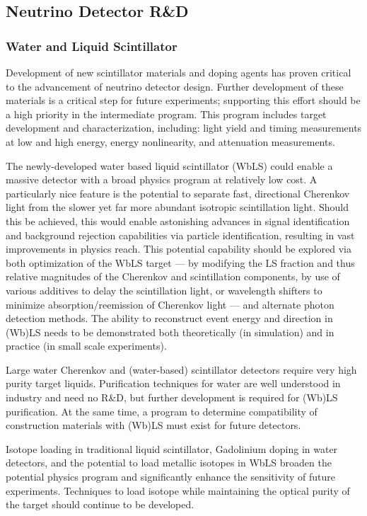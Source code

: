 \subsection{Neutrino Detector R\&D}
\label{sec:RandD}

\subsubsection{Water and Liquid Scintillator}

Development of new scintillator materials and doping agents has proven critical to the advancement 
of neutrino detector design. Further development of these materials is a critical step for future 
experiments; supporting this effort should be a high priority in the intermediate program. This program 
includes target development and characterization, including: light yield and timing measurements at 
low and high energy, energy nonlinearity, and attenuation measurements.

The newly-developed water based liquid scintillator (WbLS) could enable a massive detector with a 
broad physics program at relatively low cost. A particularly nice feature is the potential to separate fast, 
directional Cherenkov light from the slower yet far more abundant isotropic scintillation light. Should this 
be achieved, this would enable astonishing advances in signal identification and background rejection 
capabilities via particle identification, resulting in vast improvements in physics reach. This potential 
capability should be explored via both optimization of the WbLS target --- by modifying the LS fraction 
and thus relative magnitudes of the Cherenkov and scintillation components, by use of various additives 
to delay the scintillation light, or wavelength shifters to minimize absorption/reemission of Cherenkov 
light --- and alternate photon detection methods. The ability to reconstruct event energy and direction in 
(Wb)LS needs to be demonstrated both theoretically (in simulation) and in practice (in small scale 
experiments).

Large water Cherenkov and (water-based) scintillator detectors require very high purity target liquids. 
Purification techniques for water are well understood in industry and need no R\&D, but further 
development is required for (Wb)LS purification. At the same time, a program to determine compatibility 
of construction materials with (Wb)LS must exist for future detectors.

Isotope loading in traditional liquid scintillator, Gadolinium doping in water detectors, and the potential 
to load metallic isotopes in WbLS broaden the potential physics program and significantly enhance the 
sensitivity of future experiments. Techniques to load isotope while maintaining the optical purity of the 
target should continue to be developed.

